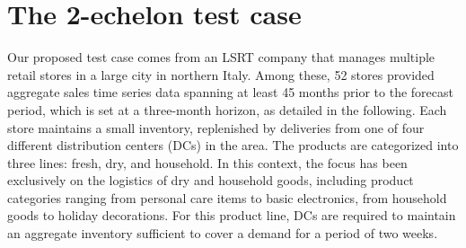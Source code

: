 \documentclass[opre,sglanonrev,11pt]{informs4}
\begin{document}



\section{The 2-echelon test case} \label{Sec:testcase}

Our proposed test case comes from an LSRT company that manages multiple retail stores in a large city in northern Italy. Among these, 52 stores provided aggregate sales time series data spanning at least 45 months prior to the forecast period, which is set at a three-month horizon, as detailed in the following. Each store maintains a small inventory, replenished by deliveries from one of four different distribution centers (DCs) in the area. The products are categorized into three lines: fresh, dry, and household. In this context, the focus has been exclusively on the logistics of dry and household goods, including product categories ranging from personal care items to basic electronics, from household goods to holiday decorations. For this product line, DCs are required to maintain an aggregate inventory sufficient to cover a demand for a period of two weeks.
\end{document}

